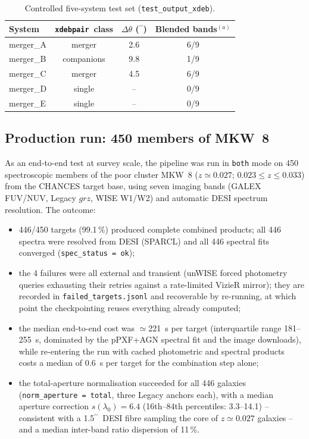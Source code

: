 \documentclass{aa}
\newcommand{\xdebpair}{\texttt{xdebpair}}
\newcommand{\arcsecond}{\ensuremath{^{\prime\prime}}}
\begin{document}
\begin{table}
\caption{Controlled five-system test set (\texttt{test\_output\_xdeb}).}
\label{tab:mergers}
\centering
\begin{tabular}{lccc}
\hline\hline
System & \xdebpair\ class & $\Delta\theta$ (\arcsecond) &
Blended bands$^{(a)}$ \\
\hline
merger\_A & merger     & 2.6 & 6/9 \\
merger\_B & companions & 9.8 & 1/9 \\
merger\_C & merger     & 4.5 & 6/9 \\
merger\_D & single     & --  & 0/9 \\
merger\_E & single     & --  & 0/9 \\
\hline
\end{tabular}
\end{table}

\subsection{Production run: 450 members of MKW~8}
\label{sec:mkw8}

As an end-to-end test at survey scale, the pipeline was run in
\texttt{both} mode on 450 spectroscopic members of the poor cluster
MKW~8 ($z\simeq0.027$; $0.023 \leq z \leq 0.033$) from the CHANCES target
base, using seven imaging bands (GALEX FUV/NUV, Legacy $grz$, WISE
W1/W2) and automatic DESI spectrum resolution. The outcome:

\begin{itemize}
\item 446/450 targets (99.1\,\%) produced complete combined products; all
  446 spectra were resolved from DESI (SPARCL) and all 446 spectral fits
  converged (\texttt{spec\_status = ok});
\item the 4 failures were all external and transient (unWISE forced
  photometry queries exhausting their retries against a rate-limited
  VizieR mirror); they are recorded in \texttt{failed\_targets.jsonl}
  and recoverable by re-running, at which point the checkpointing
  reuses everything already computed;
\item the median end-to-end cost was $\simeq$221~s per target
  (interquartile range 181--255~s, dominated by the pPXF+AGN spectral
  fit and the image downloads), while re-entering the run with cached
  photometric and spectral products costs a median of 0.6~s per target
  for the combination step alone;
\item the total-aperture normalisation succeeded for all 446 galaxies
  (\texttt{norm\_aperture = total}, three Legacy anchors each), with a
  median aperture correction $s(\lambda_0) = 6.4$
  (16th--84th percentiles: 3.3--14.1) -- consistent with a
  1.5\arcsecond\ DESI fibre sampling the core of $z\simeq0.027$
  galaxies -- and a median inter-band ratio dispersion of 11\,\%.
\end{itemize}
\end{document}
